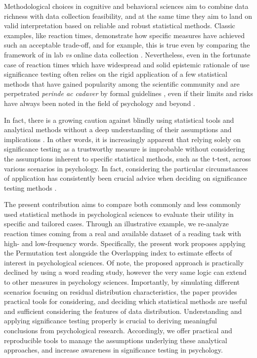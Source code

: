 \documentclass[twocolumn]{article}
\begin{document}
    Methodological choices in cognitive and behavioral sciences aim to combine data richness with data collection feasibility, and at the same time they aim to land on valid interpretation based on reliable and robust statistical methods. Classic examples, like reaction times, demonstrate how specific measures have achieved such an acceptable trade-off, and for example, this is true even by comparing the framework of in lab \textit{vs} online data collection \cite{semmelmann2017online}. Nevertheless, even in the fortunate case of reaction times which have widespread and solid epistemic rationale of use \cite{grosjean2001timing, proctor2018hick, silverman2010simple} significance testing often relies on the rigid application of a few statistical methods that have gained popularity among the scientific community and are perpetrated \textit{perinde ac cadaver} by formal guidelines \cite{cumming2012statistical}, even if their limits and risks have always been noted in the field of psychology and beyond \cite{boneau1960effects}. 
    
    In fact, there is a growing caution against blindly using statistical tools and analytical methods without a deep understanding of their assumptions and implications \cite{scheel2021hypothesis}. In other words, it is increasingly apparent that relying solely on significance testing as a trustworthy measure is improbable without considering the assumptions inherent to specific statistical methods, such as the t-test, across various scenarios in psychology. In fact, considering the particular circumstances of application has consistently been crucial advice when deciding on significance testing methods \cite{fisher1925theory}.
    
    \vspace{0.2cm}
    
    The present contribution aims to compare both commonly and less commonly used statistical methods in psychological sciences to evaluate their utility in specific and tailored cases. Through an illustrative example, we re-analyze reaction times coming from a real and available dataset of a reading task with high- and low-frequency words. Specifically, the present work proposes applying the Permutation test \cite{pesarin2010permutation} alongside the Overlapping index \cite{pastore2019measuring} to estimate effects of interest in psychological sciences. 
Of note, the proposed approach is practically declined by using a word reading study, however the very same logic can extend to other measures in psychology sciences. Importantly, by simulating different scenarios focusing on residual distribution characteristics, the paper provides practical tools for considering, and deciding which statistical methods are useful and sufficient considering the features of data distribution. Understanding and applying significance testing properly is crucial to deriving meaningful conclusions from psychological research. Accordingly, we offer practical and reproducible tools to manage the assumptions underlying these analytical approaches, and increase awareness in significance testing in psychology.
\end{document}

